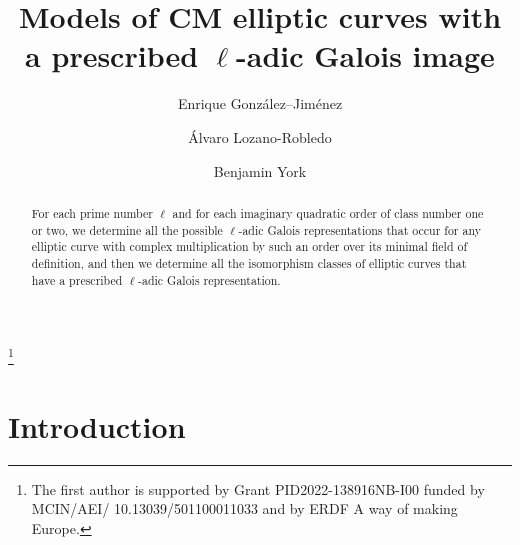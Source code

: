 \documentclass[11pt]{amsart}
\theoremstyle{definition}
\begin{document}



\title[Models of CM elliptic curves]{Models of CM elliptic curves with a prescribed $\ell$-adic Galois image}

\begin{abstract}
    For each prime number $\ell$ and for each imaginary quadratic order of class number one or two, we determine all the possible $\ell$-adic Galois representations that occur for any elliptic curve with complex multiplication by such an order over its minimal field of definition, and then we determine all the isomorphism classes of elliptic curves that have a prescribed $\ell$-adic Galois representation.
\end{abstract}

\author{Enrique Gonz\'alez--Jim\'enez}
\address{Universidad Aut{\'o}noma de Madrid, Departamento de Matem{\'a}ticas, Madrid, Spain}
\author{\'Alvaro Lozano-Robledo}
\address{University of Connecticut, Department of Mathematics, Storrs, CT 06269, USA}

\author{Benjamin York}
\address{University of Connecticut, Department of Mathematics, Storrs, CT 06269, USA}

\thanks{The first author is supported by Grant PID2022-138916NB-I00 funded by MCIN/AEI/ 10.13039/501100011033 and by ERDF A way of making Europe.}


\maketitle

\section{Introduction}
\end{document}

